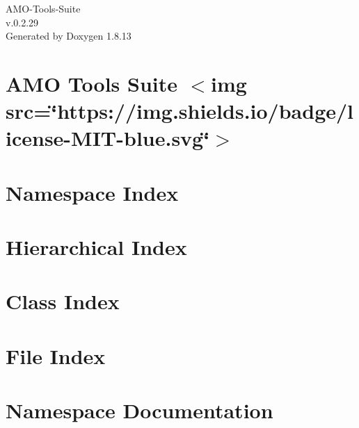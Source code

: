 \documentclass[twoside]{book}
\newcommand{\+}{\discretionary{\mbox{\scriptsize$\hookleftarrow$}}{}{}}
\newcommand{\clearemptydoublepage}{%
  \newpage{\pagestyle{empty}\cleardoublepage}%
}
\begin{document}
\hypersetup{pageanchor=false,
             bookmarksnumbered=true,
             pdfencoding=unicode
            }
\begin{titlepage}
\vspace*{7cm}
\begin{center}%
{\Large A\+M\+O-\/\+Tools-\/\+Suite \\[1ex]\large v.\+0.\+2.\+29 }\\
\vspace*{1cm}
{\large Generated by Doxygen 1.8.13}\\
\end{center}
\end{titlepage}
\clearemptydoublepage
{}
\tableofcontents
\clearemptydoublepage
{}
\hypersetup{pageanchor=true}

\chapter{A\+MO Tools Suite $<$img src=\char`\"{}https\+://img.\+shields.\+io/badge/license-\/\+M\+I\+T-\/blue.\+svg\char`\"{}$>$}
\label{index}\hypertarget{index}{}
\chapter{Namespace Index}

\chapter{Hierarchical Index}

\chapter{Class Index}

\chapter{File Index}

\chapter{Namespace Documentation}

\end{document}

